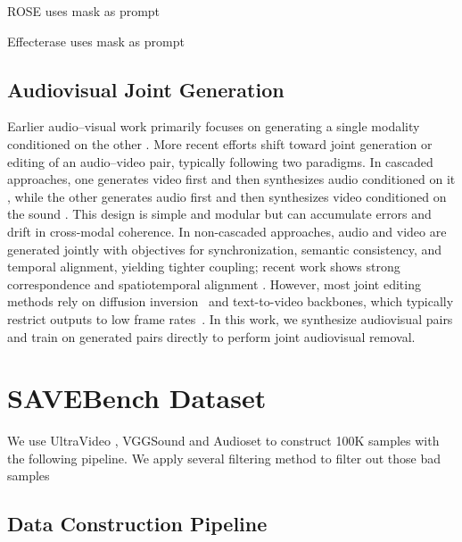 \documentclass{article}
\begin{document}
ROSE\citep{miao2025roseremoveobjectseffects} uses mask as prompt

Effecterase\citep{fu2026effecterasejointvideoobject} uses mask as prompt

\subsection{Audiovisual Joint Generation}
Earlier audio–visual work primarily focuses on generating a single modality conditioned on the other \cite{sung2023sound, li2022learning, iashin2021taming, pascual2024masked, su2023physics, wang2024v2a, yang2024draw, liang2024foundations}. More recent efforts shift toward joint generation or editing of an audio–video pair, typically following two paradigms. In cascaded approaches, one generates video first and then synthesizes audio conditioned on it \cite{comunita2024syncfusion, hu2024video, jeong2025read}, while the other generates audio first and then synthesizes video conditioned on the sound \cite{jeong2023power, yariv2024diverse, zhang2024audio}. This design is simple and modular but can accumulate errors and drift in cross-modal coherence. In non-cascaded approaches, audio and video are generated jointly with objectives for synchronization, semantic consistency, and temporal alignment, yielding tighter coupling; recent work shows strong correspondence and spatiotemporal alignment \cite{zhao2025uniform, liu2024syncflow, tang2023any}.
However, most joint editing methods rely on diffusion inversion~\cite{liang2024language,lin2025zero} and text-to-video backbones, which typically restrict outputs to low frame rates~\cite{henschel2025streamingt2vconsistentdynamicextendable}. In this work, we synthesize audiovisual pairs and train on generated pairs directly to perform joint audiovisual removal.

\section{SAVEBench Dataset}
We use UltraVideo \citep{xue2025ultravideohighqualityuhdvideo}, VGGSound\citep{chen2020vggsoundlargescaleaudiovisualdataset} and Audioset\citep{gemmeke2017audioset} to construct 100K samples with the following pipeline. We apply several filtering method to filter out those bad samples

\subsection{Data Construction Pipeline}
\end{document}
